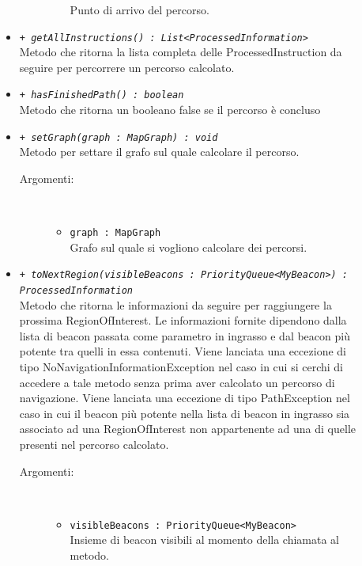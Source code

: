 \documentclass[../DefinizioneDiProdotto.tex]{subfiles}
\begin{document}
\begin{description}
\begin{itemize}
\begin{description}
\begin{itemize}
				Punto di arrivo del percorso.\end{itemize}
		\end{description}
		\item \texttt{+ \textit{getAllInstructions() : List<ProcessedInformation>}}\\
		Metodo che ritorna la lista completa delle ProcessedInstruction da seguire per percorrere un percorso calcolato.
		\item \texttt{+ \textit{hasFinishedPath() : boolean}}\\
		Metodo che ritorna un booleano false se il percorso è concluso
		\item \texttt{+ \textit{setGraph(graph : MapGraph) : void}}\\
		Metodo per settare il grafo sul quale calcolare il percorso.
		\begin{description}
			\item[Argomenti:] \
			\begin{itemize}
				\item \texttt{graph : MapGraph}\\
				Grafo sul quale si vogliono calcolare dei percorsi.\end{itemize}
		\end{description}
		\item \texttt{+ \textit{toNextRegion(visibleBeacons : PriorityQueue<MyBeacon>) : ProcessedInformation}}\\
		Metodo che ritorna le informazioni da seguire per raggiungere la prossima RegionOfInterest. Le informazioni fornite dipendono dalla lista di beacon passata come parametro in ingrasso e dal beacon più potente tra quelli in essa contenuti. 
		Viene lanciata una eccezione di tipo NoNavigationInformationException nel caso in cui si cerchi di accedere a tale metodo senza prima aver calcolato un percorso di navigazione.
		Viene lanciata una eccezione di tipo PathException nel caso in cui il beacon più potente nella lista di beacon in ingrasso sia associato ad una RegionOfInterest non appartenente ad una di quelle presenti nel percorso calcolato.
		\begin{description}
			\item[Argomenti:] \
			\begin{itemize}
				\item \texttt{visibleBeacons : PriorityQueue<MyBeacon>}\\
				Insieme di beacon visibili al momento della chiamata al metodo.\end{itemize}
		\end{description}
	\end{itemize}
\end{description}
\end{document}
